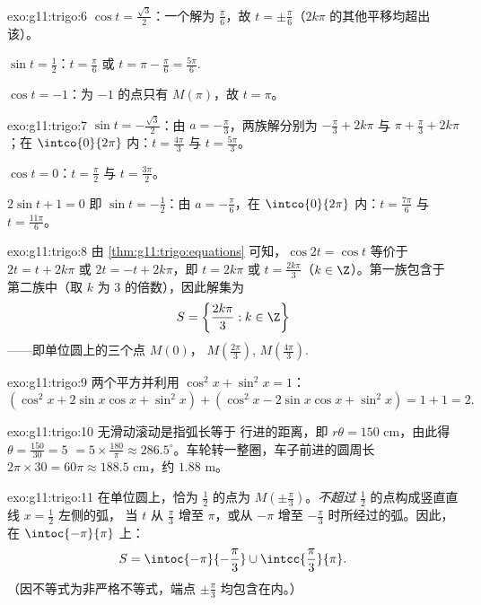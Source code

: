 \begin{solution}{exo:g11:trigo:6}
$\cos t = \frac{\sqrt3}{2}$：一个解为 $\frac\pi6$，故
$t = \pm\frac\pi6$（$2k\pi$ 的其他平移均超出该）。

$\sin t = \frac12$：$t = \frac\pi6$ 或 $t = \pi - \frac\pi6 =
\frac{5\pi}{6}$.

$\cos t = -1$：为 $-1$ 的点只有 $M(\pi)$，故 $t = \pi$。
\end{solution}

\begin{solution}{exo:g11:trigo:7}
$\sin t = -\frac{\sqrt3}{2}$：由 $a = -\frac\pi3$，两族解分别为
$-\frac\pi3 + 2k\pi$ 与 $\pi + \frac\pi3 + 2k\pi$；在
$\intco{0}{2\pi}$ 内：$t = \frac{4\pi}{3}$ 与 $t = \frac{5\pi}{3}$。

$\cos t = 0$：$t = \frac\pi2$ 与 $t = \frac{3\pi}{2}$。

$2\sin t + 1 = 0$ 即 $\sin t = -\frac12$：由 $a = -\frac\pi6$，在
$\intco{0}{2\pi}$ 内：$t = \frac{7\pi}{6}$ 与 $t = \frac{11\pi}{6}$。
\end{solution}

\begin{solution}{exo:g11:trigo:8}
由 \cref{thm:g11:trigo:equations} 可知，$\cos 2t = \cos t$ 等价于
$2t = t + 2k\pi$ 或 $2t = -t + 2k\pi$，即 $t = 2k\pi$ 或
$t = \frac{2k\pi}{3}$（$k \in \Z$）。第一族包含于
第二族中（取 $k$ 为 $3$ 的倍数），因此解集为
\[
S = \left\{\frac{2k\pi}{3} : k \in \Z\right\}
\]
——即单位圆上的三个点 $M(0)$，
$M\!\left(\frac{2\pi}{3}\right)$, $M\!\left(\frac{4\pi}{3}\right)$.
\end{solution}

\begin{solution}{exo:g11:trigo:9}
两个平方并利用 $\cos^2 x + \sin^2 x = 1$：
\[
(\cos^2 x + 2\sin x\cos x + \sin^2 x)
+ (\cos^2 x - 2\sin x\cos x + \sin^2 x)
= 1 + 1 = 2 .
\]
\end{solution}

\begin{solution}{exo:g11:trigo:10}
无滑动滚动是指弧长等于
行进的距离，即 $r\theta = 150$ cm，由此得
$\theta = \frac{150}{30} = 5$  $= 5 \times \frac{180}{\pi} \approx
286.5^\circ$。车轮转一整圈，车子前进的圆周长
$2\pi \times 30 = 60\pi \approx 188.5$ cm，约 $1.88$ m。
\end{solution}

\begin{solution}{exo:g11:trigo:11}
在单位圆上，恰为 $\frac12$ 的点为
$M\!\left(\pm\frac\pi3\right)$。\emph{不超过}
$\frac12$ 的点构成竖直直线 $x = \frac12$ 左侧的弧，
当 $t$ 从 $\frac\pi3$ 增至 $\pi$，或从 $-\pi$ 增至
$-\frac\pi3$ 时所经过的弧。因此，在 $\intoc{-\pi}{\pi}$ 上：
\[
S = \intoc{-\pi}{-\frac{\pi}{3}} \cup \intcc{\frac{\pi}{3}}{\pi}.
\]
（因不等式为非严格不等式，端点 $\pm\frac\pi3$ 均包含在内。）
\end{solution}

